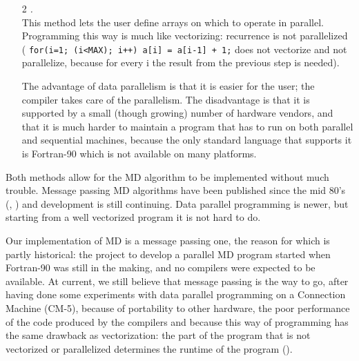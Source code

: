 {\begin{enumerate}
                The implementation is typically done by calling a set of 
                library routines to send and receive data to and from 
                other processors. Almost all hardware vendors support 
                this way of
                parallelism in their C and Fortran compilers.
                
\item[2]        {\em {}.}\\
                This method lets the user define arrays on which to
                operate in parallel. Programming this way is much
                like vectorizing: recurrence is not parallelized
                ({\eg} {\tt for(i=1; (i<MAX); i++) a[i] = a[i-1] + 1;}
                does not vectorize and not parallelize, because for
                every i the result from the previous step is needed).

                The advantage of data parallelism is that it is
                easier for the user; the compiler takes care of the
                parallelism. The disadvantage is that it is supported
                by a small (though growing) number of hardware vendors,
                and that it is much harder to maintain a program that has to
                run on both parallel and sequential machines, because
                the only standard language that supports it is Fortran-90
                which is not available on many platforms.
\end{enumerate}
Both methods allow for the MD algorithm to be implemented without much
trouble. Message passing MD algorithms have been published
since the mid 80's (\cite{Fincham87}, \cite{Raine89}) 
and development is still continuing. 
Data parallel programming is newer,
but starting from a well vectorized program it is not hard to do.

Our implementation of MD is a message passing one, the reason for which
is partly historical: the project to develop a parallel MD program started
when Fortran-90 was still in the making, and no compilers were
expected to be available. 
At current, we still believe that message passing is the way
to go, after having done some experiments with data parallel programming on a
Connection Machine (CM-5), because of portability to other hardware,
the poor performance of the code produced by the compilers 
and because this way of programming
has the same drawback as vectorization: the part of the program that is
not vectorized or parallelized determines the runtime of the program
().

}
